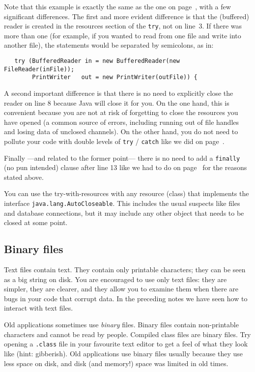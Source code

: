 Note that this example is exactly the same as the one on
page~\pageref{code:basic-example}, with a few significant
differences. The first and more evident difference is that the
(buffered) reader is created in the resources section of the
\verb+try+, not on line~3.  If there was more than one (for example,
if you wanted to read from one file and write into another file), the
statements would be separated by semicolons, as in:

\begin{verbatim}
   try (BufferedReader in = new BufferedReader(new FileReader(inFile));
        PrintWriter   out = new PrintWriter(outFile)) {
\end{verbatim}

A second important difference is that there is no need to explicitly
close the reader on line 8 because Java will close it for you. On the
one hand, this is convenient because you are not at risk of forgetting
to close the resources you have opened (a common source of errors,
including running out of file handles and losing data of unclosed
channels). On the other hand, you do not need to pollute your code
with double levels of \verb+try+ / \verb+catch+ like we did on
page~\pageref{code:basic-reading-example-with-finally}. 

Finally ---and related to the former point--- there is no need to add
a \verb+finally+ (no pun intended) clause after line 13 like we had to
do on page~\pageref{code:basic-reading-example-with-finally} for the
reasons stated above.

You can use the try-with-resources with any resource (class) that
implements the interface \verb+java.lang.AutoCloseable+. This includes
the usual suspects like files and database connections, but it may
include any other object that needs to be closed at some point.




\subsection{Binary files}
\label{sec:binary-files}

Text files contain text. They contain only printable characters; they
can be seen as a big string on disk. You are encouraged to
use only text files: they are simpler, they are clearer, and they
allow you to examine them when there are bugs in your code that
corrupt data. In the
preceding notes we have seen how to interact with text files. 

Old applications sometimes use \emph{binary} files. Binary files
contain non-printable characters and cannot be read by
people. Compiled class files are binary files. Try
opening a \verb+.class+ file in your favourite text editor to get a
feel of what they look like (hint: gibberish). Old applications use
binary files usually because they use less space on disk, and disk (and
memory!) space was limited in old times. 

